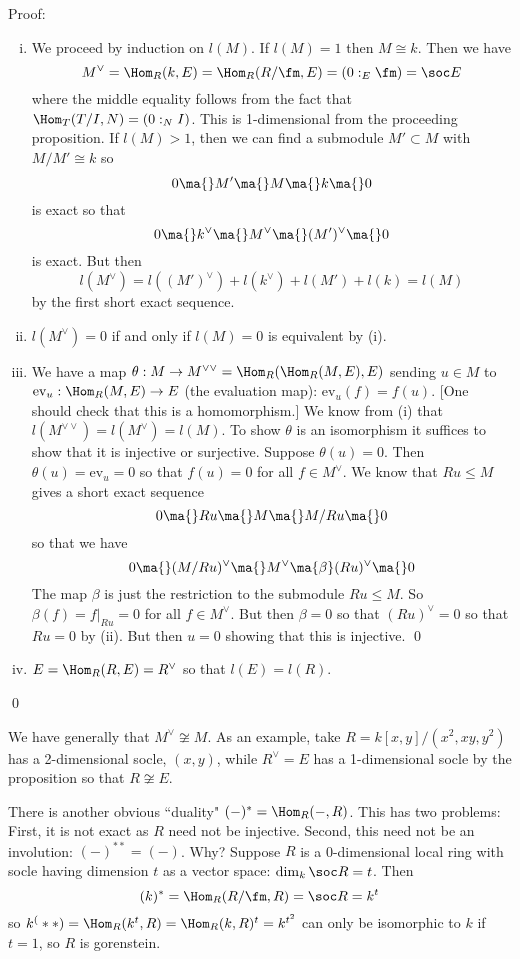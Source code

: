 \noindent Proof:
\begin{enumerate}[(i)]
\item We proceed by induction on $l(M)$. If $l(M)=1$ then $M \cong k$. Then we have
\[
M^\vee = \Hom_R(k,E)=\Hom_R(R/\fm,E)=(0:_E \fm)=\soc E
\]
where the middle equality follows from the fact that $\Hom_T(T/I,N)=(0:_N I)$. This is 1-dimensional from the proceeding proposition. If $l(M)>1$, then we can find a submodule $M' \subset M$ with $M/M' \cong k$ so 
\[
0 \ma{} M' \ma{} M \ma{} k \ma{} 0
\]
is exact so that 
\[
0 \ma{} k^\vee \ma{} M^\vee \ma{} (M')^\vee \ma{} 0
\]
is exact. But then
\[
l(M^\vee)=l((M')^\vee)+l(k^\vee)+l(M')+l(k)=l(M)
\]
by the first short exact sequence. 

\item $l(M^\vee)=0$ if and only if $l(M)=0$ is equivalent by (i).

\item We have a map $\theta: M \to M^{\vee \vee}=\Hom_R(\Hom_R(M,E),E)$ sending $u \in M$ to $\text{ev}_u: \Hom_R(M,E) \to E$ (the evaluation map): $\text{ev}_u(f)=f(u)$. [One should check that this is a homomorphism.] We know from (i) that $l(M^{\vee \vee})=l(M^\vee)=l(M)$. To show $\theta$ is an isomorphism it suffices to show that it is injective or surjective. Suppose $\theta(u)=0$. Then $\theta(u)=\text{ev}_u=0$ so that $f(u)=0$ for all $f \in M^\vee$. We know that $Ru \leq M$ gives a short exact sequence
\[
0 \ma{} Ru \ma{} M \ma{} M/Ru \ma{} 0
\]
so that we have
\[
0 \ma{} (M/Ru)^\vee \ma{} M^\vee \ma{\beta} (Ru)^\vee \ma{} 0
\]
The map $\beta$ is just the restriction to the submodule $Ru \leq M$. So $\beta(f)=f|_{Ru}=0$ for all $f \in M^\vee$. But then $\beta=0$ so that $(Ru)^\vee=0$ so that $Ru=0$ by (ii). But then $u=0$ showing that this is injective. \qed \\

\item $E=\Hom_R(R,E)=R^\vee$ so that $l(E)=l(R)$.

\end{enumerate}
\qed \\

\begin{rem}
We have generally that $M^\vee \not\cong M$. As an example, take $R=k[x,y]/(x^2,xy,y^2)$ has a 2-dimensional socle, $(x,y)$, while $R^\vee=E$ has a 1-dimensional socle by the proposition so that $R \not\cong E$. 
\end{rem}

\begin{rem}
There is another obvious ``duality" $(-)^*=\Hom_R(-,R)$. This has two problems: First, it is not exact as $R$ need not be injective. Second, this need not be an involution: $(-)^{**}=(-)$. Why? Suppose $R$ is a 0-dimensional local ring with socle having dimension $t$ as a vector space: $\dim_k \soc R=t$. Then 
\[
(k)^*=\Hom_R(R/\fm,R)=\soc R=k^t
\]
so $k^(**)=\Hom_R(k^t,R)=\Hom_R(k,R)^t=k^{t^2}$ can only be isomorphic to $k$ if $t=1$, so $R$ is gorenstein. 
\end{rem}

